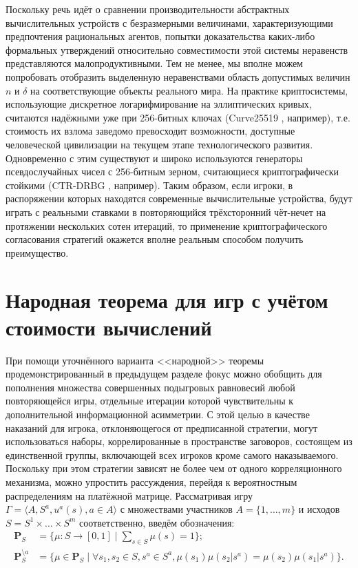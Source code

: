 Поскольку речь идёт о сравнении производительности абстрактных вычислительных устройств с безразмерными величинами, характеризующими предпочтения рациональных агентов, попытки доказательства каких-либо формальных утверждений относительно совместимости этой системы неравенств представляются малопродуктивными. Тем не менее, мы вполне можем попробовать отобразить выделенную неравенствами область допустимых величин $n$ и $\delta$ на соответствующие объекты реального мира. На практике криптосистемы, использующие дискретное логарифмирование на эллиптических кривых, считаются надёжными уже при 256-битных ключах (Curve25519 \cite{Bernstein}, например), т.е. стоимость их взлома заведомо превосходит возможности, доступные человеческой цивилизации на текущем этапе технологического развития. Одновременно с этим существуют и широко используются генераторы псевдослучайных чисел с 256-битным зерном, считающиеся криптографически стойкими (CTR-DRBG \cite{Hoang}, например). Таким образом, если игроки, в распоряжении которых находятся современные вычислительные устройства, будут играть с реальными ставками в повторяющийся трёхсторонний чёт-нечет на протяжении нескольких сотен итераций, то применение криптографического согласования стратегий окажется вполне реальным способом получить преимущество.

\section{Народная теорема для игр с учётом стоимости вычислений}\label{sec:ch3/sect5}

При помощи уточнённого варианта <<народной>> теоремы продемонстрированный в предыдущем разделе фокус можно обобщить для пополнения множества совершенных подыгровых равновесий любой повторяющейся игры, отдельные итерации которой чувствительны к дополнительной информационной асимметрии. С этой целью в качестве наказаний для игрока, отклоняющегося от предписанной стратегии, могут использоваться наборы, коррелированные в пространстве заговоров, состоящем из единственной группы, включающей всех игроков кроме самого наказываемого. Поскольку при этом стратегии зависят не более чем от одного корреляционного механизма, можно упростить рассуждения, перейдя к вероятностным распределениям на платёжной матрице. Рассматривая игру $\Gamma = \langle A, S^a, u^a(s), a \in A \rangle$ с множествами участников $A = \{1, \ldots, m\}$ и исходов $S = S^1 \times \ldots \times S^m$ соответственно, введём обозначения:
\begin{align*}
	\mathbf{P}_S &= \{\mu : S \rightarrow [0, 1] \mid \sum_{s \in S} \mu(s) = 1\}; \\
	\mathbf{P}_S^{\setminus a} &= \{\mu \in \mathbf{P}_S \mid \forall s_1, s_2 \in S, s^a \in S^a, \mu(s_1) \mu(s_2 | s^a) = \mu(s_2) \mu(s_1 | s^a)\}.
\end{align*}

